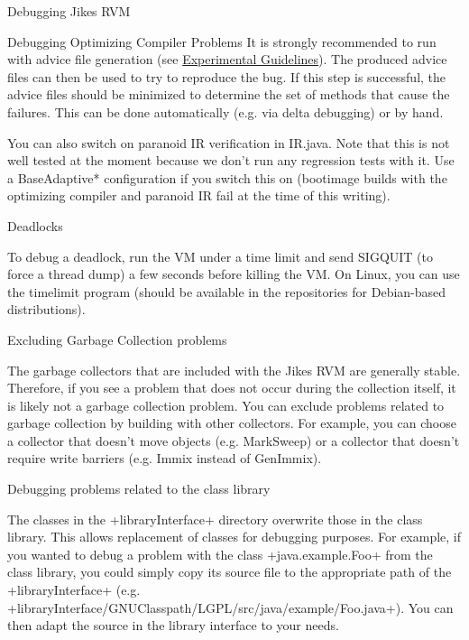 \begin{chapter}{Debugging Jikes RVM}
\begin{section}{Debugging Optimizing Compiler Problems}
It is strongly recommended to run with advice file generation (see \hyperref[cha:experimentalguidelines]{Experimental Guidelines}). The produced advice files can then be used to try to reproduce the bug. If this step is successful, the advice files should be minimized to determine the set of methods that cause the failures. This can be done automatically (e.g. via delta debugging) or by hand.

You can also switch on paranoid IR verification in IR.java. Note that this is not well tested at the moment because we don't run any regression tests with it. Use a BaseAdaptive* configuration if you switch this on (bootimage builds with the optimizing compiler and paranoid IR fail at the time of this writing).

\begin{subsection}{Deadlocks}

To debug a deadlock, run the VM under a time limit and send SIGQUIT (to force a thread dump) a few seconds before killing the VM. On Linux, you can use the timelimit program (should be available in the repositories for Debian-based distributions).
\end{subsection}

\begin{subsection}{Excluding Garbage Collection problems}

The garbage collectors that are included with the Jikes RVM are generally stable. Therefore, if you see a problem that does not occur during the collection itself, it is likely not a garbage collection problem. You can exclude problems related to garbage collection by building with other collectors. For example, you can choose a collector that doesn't move objects (e.g. MarkSweep) or a collector that doesn't require write barriers (e.g. Immix instead of GenImmix).
\end{subsection}

\end{section}

\begin{section}{Debugging problems related to the class library}

The classes in the \spverb+libraryInterface+ directory overwrite those in the class library. This allows replacement of classes for debugging purposes. For example, if you wanted to debug a problem with the class \spverb+java.example.Foo+ from the class library, you could simply copy its source file to the appropriate path of the \spverb+libraryInterface+ (e.g. \spverb+libraryInterface/GNUClasspath/LGPL/src/java/example/Foo.java+). You can then adapt the source in the library interface to your needs.

\end{section}



\end{chapter}
